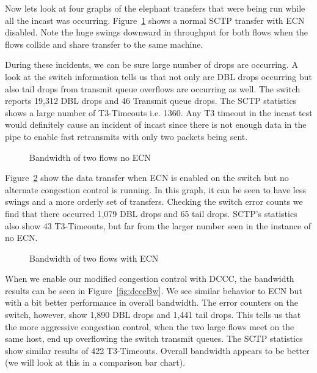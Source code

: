 \documentclass[12pt]{article}
\begin{document}
\newpage

Now lets look at  four graphs of the elephant transfers that were being run while all
the incast was occurring. Figure~\ref{fig:noEcnBw} shows a normal SCTP transfer with
ECN disabled. Note the huge swings downward in throughput for both
flows when the flows collide and share transfer to the same machine. 

During these incidents, we can be sure large number of drops are occurring. A look at the switch
information tells us that not only are DBL drops occurring but also tail
drops from transmit queue overflows are occurring as well.  The switch reports 19,312 DBL drops
and 46 Transmit queue drops. The SCTP statistics shows
a large number of T3-Timeouts i.e. 1360. Any T3 timeout in the incast test would definitely
cause an incident of incast since there is not enough data in the pipe to enable fast retransmits with
only two packets being sent.

\begin{figure}[h]
\centering
{}
\caption{Bandwidth of two flows no ECN}
\label{fig:noEcnBw}
\end{figure}

\newpage

Figure~\ref{fig:ecnBw} show the data transfer when ECN is enabled on
the switch but no alternate congestion control is running. In this graph,
it can be seen to have  less swings and a more orderly set of transfers. Checking
the switch error counts we find that there occurred 1,079 DBL drops and 65 tail
drops. SCTP's statistics also show 43 T3-Timeouts, but far from the larger
number seen in the instance of no ECN.

\begin{figure}[h]
\centering
{}
\caption{Bandwidth of two flows with ECN}
\label{fig:ecnBw}
\end{figure}

\newpage

When we enable our modified congestion control with DCCC, the bandwidth results can
be seen in Figure~\ref{fig:dcccBw}.  We see similar behavior to ECN but with a bit better performance in
overall bandwidth. The error counters on the switch, however,
show 1,890 DBL drops and 1,441 tail drops. This tells us that  the more aggressive congestion
control, when the two large flows meet on the same host, end up overflowing the switch
transmit queues. The SCTP statistics show similar results of 422 T3-Timeouts. Overall bandwidth
appears to be better (we will look at this in a comparison bar chart).
\end{document}
